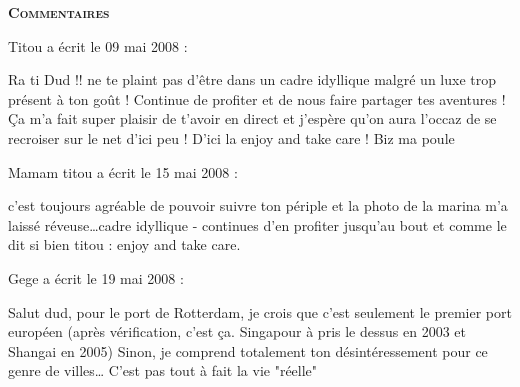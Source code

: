 \bigskip
\textbf{\textsc{Commentaires}}

\medskip
Titou a écrit le 09 mai 2008 :
\begin{displayquote}
Ra ti Dud !! ne te plaint pas d'être dans un cadre idyllique malgré un luxe trop présent à ton goût ! Continue de profiter et de nous faire partager tes aventures ! Ça m'a fait super plaisir de t'avoir en direct et j'espère qu'on aura l'occaz de se recroiser sur le net d'ici peu ! D'ici la enjoy and take care !
Biz ma poule
\end{displayquote}

\medskip
Mamam titou a écrit le 15 mai 2008 :
\begin{displayquote}
c'est toujours agréable de pouvoir suivre ton périple et la photo de la marina m'a laissé réveuse\dots cadre idyllique - continues d'en profiter jusqu'au bout et comme le dit si bien titou : enjoy and take care.
\end{displayquote}

\medskip
Gege a écrit le 19 mai 2008 :
\begin{displayquote}
Salut dud,
pour le port de Rotterdam, je crois que c'est seulement le premier port européen (après vérification, c'est ça. Singapour à pris le dessus en 2003 et Shangai en 2005)
Sinon, je comprend totalement ton désintéressement pour ce genre de villes\dots
C'est pas tout à fait la vie "réelle"
\end{displayquote}

\vfill
